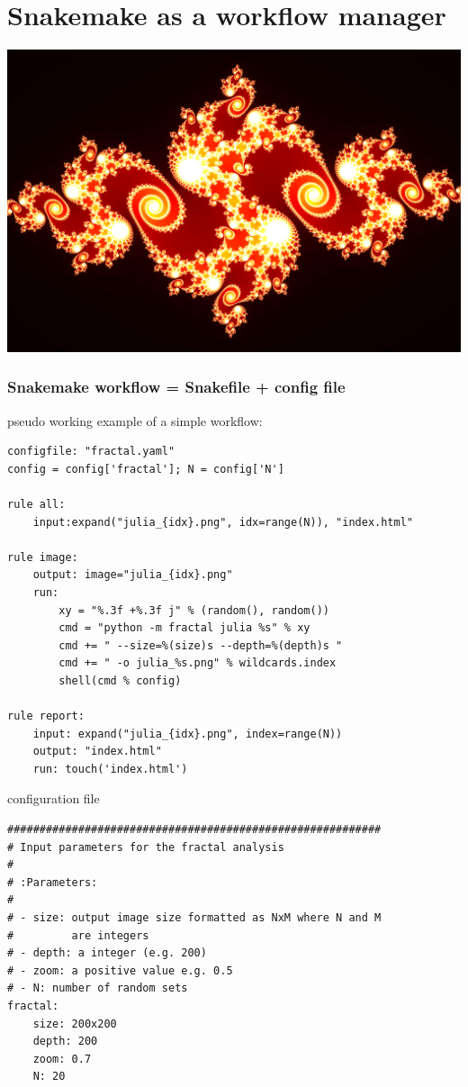 \documentclass{beamer}
\begin{document}
\section{Snakemake as a workflow manager}


\begin{frame}
 \includegraphics[width=1.\textwidth, height=0.8\textheight]{images/julia_nice.png}
\end{frame}


\begin{frame}[fragile]
\frametitle{Snakemake workflow = Snakefile + config file}
\begin{block}{pseudo working example of a simple workflow:}
  \begin{lstlisting}
configfile: "fractal.yaml"
config = config['fractal']; N = config['N']

rule all:
    input:expand("julia_{idx}.png", idx=range(N)), "index.html"

rule image:
    output: image="julia_{idx}.png"
    run:
        xy = "%.3f +%.3f j" % (random(), random())
        cmd = "python -m fractal julia %s" % xy
        cmd += " --size=%(size)s --depth=%(depth)s "
        cmd += " -o julia_%s.png" % wildcards.index        
        shell(cmd % config)

rule report:
    input: expand("julia_{idx}.png", index=range(N))
    output: "index.html"
    run: touch('index.html')
\end{lstlisting} 
\end{block}
\end{frame}

\begin{frame}[fragile]
\begin{block}{configuration file}
 \begin{lstlisting}
##########################################################
# Input parameters for the fractal analysis
#
# :Parameters: 
#
# - size: output image size formatted as NxM where N and M 
#         are integers
# - depth: a integer (e.g. 200)
# - zoom: a positive value e.g. 0.5
# - N: number of random sets
fractal:
    size: 200x200
    depth: 200
    zoom: 0.7
    N: 20
 \end{lstlisting}
\end{block}
\end{frame}
\end{document}

